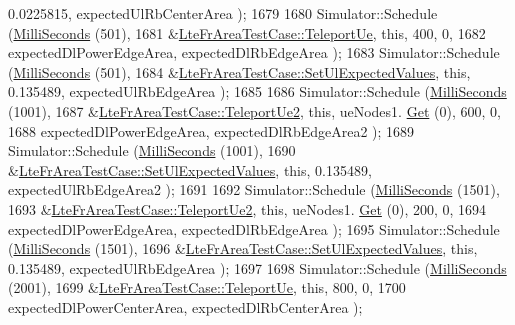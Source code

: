 \begin{DoxyCode}
       0.0225815, expectedUlRbCenterArea );
1679 
1680   Simulator::Schedule (\hyperlink{group__timecivil_gaf26127cf4571146b83a92ee18679c7a9}{MilliSeconds} (501),
1681                        &\hyperlink{classLteFrAreaTestCase_ad644210c338d4e34da3c5d7f0c511269}{LteFrAreaTestCase::TeleportUe}, \textcolor{keyword}{this}, 400, 0,
1682                        expectedDlPowerEdgeArea, expectedDlRbEdgeArea );
1683   Simulator::Schedule (\hyperlink{group__timecivil_gaf26127cf4571146b83a92ee18679c7a9}{MilliSeconds} (501),
1684                        &\hyperlink{classLteFrAreaTestCase_aac2718dc3703d2ad389f88ffa20d035e}{LteFrAreaTestCase::SetUlExpectedValues}, \textcolor{keyword}{this},
       0.135489, expectedUlRbEdgeArea );
1685 
1686   Simulator::Schedule (\hyperlink{group__timecivil_gaf26127cf4571146b83a92ee18679c7a9}{MilliSeconds} (1001),
1687                        &\hyperlink{classLteFrAreaTestCase_a726ebada64f79768017f64e39b4f22e3}{LteFrAreaTestCase::TeleportUe2}, \textcolor{keyword}{this}, ueNodes1.
      \hyperlink{classns3_1_1NodeContainer_a9ed96e2ecc22e0f5a3d4842eb9bf90bf}{Get} (0), 600, 0,
1688                        expectedDlPowerEdgeArea, expectedDlRbEdgeArea2 );
1689   Simulator::Schedule (\hyperlink{group__timecivil_gaf26127cf4571146b83a92ee18679c7a9}{MilliSeconds} (1001),
1690                        &\hyperlink{classLteFrAreaTestCase_aac2718dc3703d2ad389f88ffa20d035e}{LteFrAreaTestCase::SetUlExpectedValues}, \textcolor{keyword}{this},
       0.135489, expectedUlRbEdgeArea2 );
1691 
1692   Simulator::Schedule (\hyperlink{group__timecivil_gaf26127cf4571146b83a92ee18679c7a9}{MilliSeconds} (1501),
1693                        &\hyperlink{classLteFrAreaTestCase_a726ebada64f79768017f64e39b4f22e3}{LteFrAreaTestCase::TeleportUe2}, \textcolor{keyword}{this}, ueNodes1.
      \hyperlink{classns3_1_1NodeContainer_a9ed96e2ecc22e0f5a3d4842eb9bf90bf}{Get} (0), 200, 0,
1694                        expectedDlPowerEdgeArea, expectedDlRbEdgeArea );
1695   Simulator::Schedule (\hyperlink{group__timecivil_gaf26127cf4571146b83a92ee18679c7a9}{MilliSeconds} (1501),
1696                        &\hyperlink{classLteFrAreaTestCase_aac2718dc3703d2ad389f88ffa20d035e}{LteFrAreaTestCase::SetUlExpectedValues}, \textcolor{keyword}{this},
       0.135489, expectedUlRbEdgeArea );
1697 
1698   Simulator::Schedule (\hyperlink{group__timecivil_gaf26127cf4571146b83a92ee18679c7a9}{MilliSeconds} (2001),
1699                        &\hyperlink{classLteFrAreaTestCase_ad644210c338d4e34da3c5d7f0c511269}{LteFrAreaTestCase::TeleportUe}, \textcolor{keyword}{this}, 800, 0,
1700                        expectedDlPowerCenterArea, expectedDlRbCenterArea );

\end{DoxyCode}

